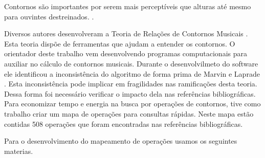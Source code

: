 \documentclass[11pt]{article}
\begin{document}
Contornos são importantes por serem mais perceptíveis que alturas
até mesmo para ouvintes destreinados.
\cite[p. 225]{Marvin1987}.

Diversos autores desenvolveram a Teoria de Relações de Contornos
Musicais \cite{Friedmann1985, Friedmann1987, Morris1987, Marvin1987,
  Marvin1988, Polansky1992, Morris1993, Clifford1995, Quinn1997,
  Beard2003, Sampaio2008, Schultz2008, Schultz2009, Bor2009}. Esta
teoria dispõe de ferramentas que ajudam a entender os contornos.
O orientador deste trabalho vem desenvolvendo programas computacionais para
auxiliar no cálculo de contornos musicais.
Durante o desenvolvilmeto do software ele identificou a
inconsistência do algoritmo de forma prima de Marvin e Laprade
\cite{Marvin1987}. Esta inconsistência pode implicar em fragilidades
nas ramificações desta teoria.
Dessa forma foi necessário verificar o
impacto dela nas referências bibliográficas.
Para economizar tempo e energia na busca por operações de contornos,
tive como trabalho criar um mapa de operações para consultas rápidas.
Neste mapa estão contidas 508 operações que foram
encontradas nas referências bibliográficas.

\label{sec:materiais}

Para o desenvolvimento do mapeamento de operações usamos os seguintes
materias.
\end{document}

